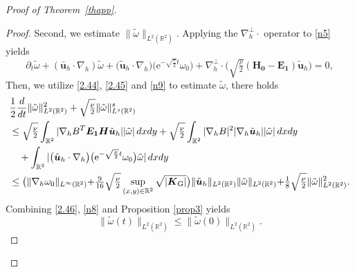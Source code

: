 \documentclass[pdflatex,sn-mathphys-num]{sn-jnl}%
\theoremstyle{thmstyleone}%
\theoremstyle{thmstyletwo}%
\theoremstyle{thmstylethree}%
\theoremstyle{thmstyletwo}
\begin{document}
\begin{proof}[Proof of Theorem~{\upshape\ref{thapp}}]
\begin{proof}
	Second, we estimate $\lVert \tilde{\omega}
	\rVert_{{L}^{2}(\mathbb{R}^2)}$.
	Applying the $\nabla_{ h}^\bot\cdot$ operator to \eqref{n5} yields
	\begin{equation}\label{n9}
		\partial_{t}\tilde{\omega}+(\bar {\boldsymbol u}_h \cdot \nabla_h) \tilde{\omega}
		+\big(\tilde{\boldsymbol{u}}_h\cdot\nabla_{ h}\big)\big(\mathrm{e}^{-\sqrt{\frac\nu2}t}{\omega}_0\big)
		+\nabla_h^\bot\cdot
		\Big(
		\sqrt{\tfrac{\nu}{2}}
		(\boldsymbol{H_0}
		-\boldsymbol{E_1})
		\tilde{\boldsymbol{u}}_h\Big)=0,
	\end{equation}
		Then, we utilize \eqref{2.44}, \eqref{2.45} and \eqref{n9}  to estimate $\tilde{\omega}$, there holds
	\begin{align*} 
		&	\frac12\frac{d}{dt}\lVert\tilde{\omega}\rVert_{L^2(\mathbb{R}^2)}^2+\sqrt{\tfrac{\nu}{2}}\lVert
		\tilde{\omega}
		\rVert_{L^s(\mathbb{R}^2)}^s
		\notag\\\notag
		&\leq\sqrt{\tfrac{\nu}{2}} \int_{\mathbb{R}^2} |\nabla_hB^T\boldsymbol{E_1} \boldsymbol{H}
		\tilde{\boldsymbol{u}}_h| |\tilde{\omega}| \,dx{d}y 
		+\sqrt{\tfrac{\nu}{2}}
		\int_{\mathbb{R}^2}
		|\nabla_hB|^2|\nabla_h\tilde{\boldsymbol{u}}_h||\tilde{\omega}| \,dx{d}y \\
		&\quad+\int_{\mathbb{R}^2}
		|\big(\tilde{\boldsymbol{u}}_h\cdot\nabla_{ h}\big)\big(\mathrm{e}^{-\sqrt{\frac\nu2}t}{\omega}_0\big)\tilde{\omega}|
		\,dx{d}y\notag
		\\
		&\leq 
		\big(
		\lVert\nabla_{h}{\omega}_0\lVert_{L^\infty(\mathbb{R}^2)}
		+\tfrac{9}{16}\sqrt{\tfrac{\nu}{2}}
		\sup\limits_{(x,y)\in \mathbb{R}^2}\sqrt{|\boldsymbol{K}_{\mathrm{G}}|}\big)
		\lVert\tilde{\boldsymbol{u}}_h\lVert_{L^2(\mathbb{R}^2)}
		\lVert\tilde{\omega}\lVert_{L^2(\mathbb{R}^2)}
		+\tfrac18\sqrt{\tfrac{\nu}{2}}
		\lVert\tilde{\omega}\lVert^{2}_{L^2(\mathbb{R}^2)}.
	\end{align*}
	Combining \eqref{2.46}, \eqref{n8} and Proposition \ref{prop3} yields
	\begin{equation}\label{n12}
		\lVert\tilde{\omega}(t)\rVert_{L^2(\mathbb{R}^2)}\leq
		\lVert\tilde{\omega}(0)\rVert_{L^2(\mathbb{R}^2)}
		.
	\end{equation}
	
	

	


\end{proof}
\end{proof}
\end{document}
